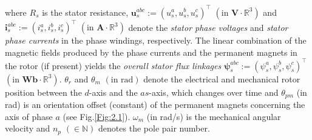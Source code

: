where $R_s$ is the stator resistance, $\mathbf{u}^{abc}_{s} := (u^a_s, u^b_s, u^c_s)^\top$ $(\text{in } \mathbf{V} \cdot \mathbb{R}^3)$ and $\mathbf{i}^{abc}_s := (i^a_s, i^b_s, i^c_s)^\top$ $(\text{in } \mathbf{A} \cdot \mathbb{R}^3)$ denote the \emph{stator phase voltages} and \emph{stator phase currents} in the phase windings, respectively.  The linear combination of the magnetic fields produced by the phase currents and the permanent magnets in the rotor (if present) yields the \emph{overall stator flux linkages} $\boldsymbol{\psi}^{abc}_s:= (\psi^a_s, \psi^b_s, \psi^c_s)^\top$ $(\text{in } \mathbf{Wb} \cdot \mathbb{R}^3)$. $\theta_r$ and $\theta_m$ $(\text{in rad})$ denote the electrical and mechanical rotor position between the $d$-axis and the $as$-axis, which changes over time and $\theta_{pm}$ (in rad) is an orientation offset (constant) of the permanent magnets concerning the axis of phase $a$ (see Fig.\ref{Fig:2.1}). $\omega_m$ (in rad/s) is the mechanical angular velocity and  $n_p$ $(\in \mathbb{N})$ denotes the pole pair number.

